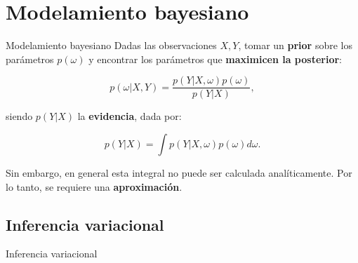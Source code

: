 
\section{Modelamiento bayesiano}

\begin{frame}{Modelamiento bayesiano}
    Dadas las observaciones $X, Y$, tomar un \textbf{prior} sobre los parámetros $p(\omega)$ y encontrar los parámetros que \textbf{maximicen la posterior}:
    
    \begin{equation}
        p(\omega|X,Y) = \dfrac{p(Y|X,\omega)p(\omega)}{p(Y|X)},
    \end{equation}
    
    siendo $p(Y|X)$ la \textbf{evidencia}, dada por:
    
    \begin{equation}
        p(Y|X) = \int p(Y|X,\omega) p(\omega) d\omega.
    \end{equation}
    
    Sin embargo, en general esta integral no puede ser calculada analíticamente. Por lo tanto, se requiere una \textbf{aproximación}.
\end{frame}

\subsection{Inferencia variacional}

\begin{frame}{Inferencia variacional}



    
    
    
\end{frame}


